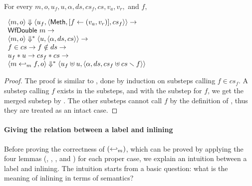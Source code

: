 \begin{lemma}
  \label{lem-inlinedmm-meth2}
  \mbox{}\\
  For every $m, o, u_f, u, \alpha, ds, cs_f, cs, v_a, v_r,$ and $f,$
  \begin{center}
    \begin{math}
      \begin{array}{l}
        \langle m, o \rangle \Downarrow \langle u_f, \langle \textsf{Meth},  [ f \leftarrow (v_a, v_r) ], cs_f \rangle \rangle \to \\
        \textsf{WfDouble}\ m \to \\
        \langle m, o \rangle \Downarrow^{\ast} \langle u, \langle \alpha, ds, cs \rangle \rangle \to \\
        f \in cs \to f \notin ds \to \\
        u_f \ast u \to cs_f \ast cs \to \\
        \langle m \hookleftarrow_{m}{} f, o \rangle \Downarrow^{\ast} \langle u_f \uplus u, \langle \alpha, ds, cs_f \uplus cs \smallsetminus{} f \rangle \rangle
      \end{array}
    \end{math}
  \end{center}
\end{lemma}
\begin{proof}
  The proof is similar to , done by
  induction on substeps calling $f \in cs_f$. A substep calling $f$
  exists in the substeps, and with the substep for $f$, we get the
  merged substep by . The other
  substeps cannot call $f$ by the definition of \Substeps{}, thus they
  are treated as an intact case.
\end{proof}

\paragraph{Giving the relation between a label and inlining}

Before proving the correctness of $(\hookleftarrow_{m})$, which can be
proved by applying the four lemmas (,
, , and
) for each proper case, we explain an
intuition between a label and inlining. The intuition starts from a
basic question: what is the meaning of inlining in terms of semantics?

